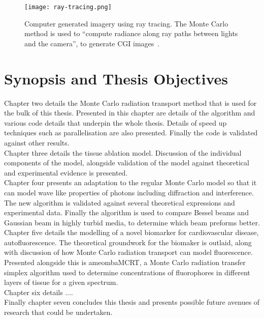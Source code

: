 \begin{figure}[!htb]
\centering
\texttt{[image: ray-tracing.png]}
\caption{Computer generated imagery using ray tracing. The Monte Carlo method is used to ``compute radiance along ray paths between lights and the camera'', to generate CGI images~\cite{pharr2016physically}.}
\label{fig:ray-trace}
\end{figure}


\section{Synopsis and Thesis Objectives}

Chapter two details the Monte Carlo radiation transport method that is used for the bulk of this thesis.
Presented in this chapter are details of the algorithm and various code details that underpin the whole thesis.
Details of speed up techniques such as parallelisation are also presented.
Finally the code is validated against other results.\\


Chapter three details the tissue ablation model.
Discussion of the individual components of the model, alongside validation of the model against theoretical and experimental evidence is presented.\\


Chapter four presents an adaptation to the regular Monte Carlo model so that it can model wave like properties of photons including diffraction and interference.
The new algorithm is validated against several theoretical expressions and experimental data.
Finally the algorithm is used to compare Bessel beams and Gaussian beam in highly turbid media, to determine which beam preforms better.\\


Chapter five details the modelling of a novel biomarker for cardiovascular disease, autofluorescence.
The theoretical groundwork for the biomaker is outlaid, along with discussion of how Monte Carlo radiation transport can model fluorescence.
Presented alongside this is ameombaMCRT, a Monte Carlo radiation transfer simplex algorithm used to determine concentrations of fluorophores in different layers of tissue for a given spectrum.\\


Chapter six details ....\\


Finally chapter seven concludes this thesis and presents possible future avenues of research that could be undertaken.